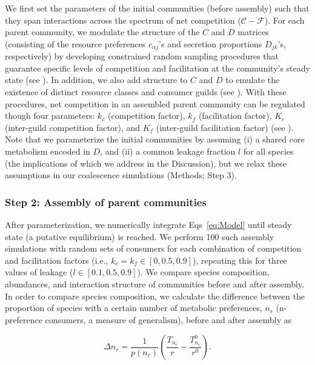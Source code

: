 \documentclass[10pt,letterpaper]{article}
\begin{document}
We first set the parameters of the initial communities (before assembly) such that they span interactions across the spectrum of net competition ($\mathcal{C} - \mathcal{F}$). For each parent community, we modulate the structure of the $C$ and $D$ matrices (consisting of the resource preferences $ c_{\alpha j} $'s and secretion proportions $ D_{jk} $'s, respectively) by developing constrained random sampling procedures that guarantee specific levels of competition and facilitation at the community's steady state (see ). In addition, we also add structure to $C$ and $D$ to emulate the existence of distinct resource classes and consumer guilds (see ). With these procedures, net competition in an assembled parent community can be regulated though four parameters: $k_c$ (competition factor), $k_f$ (facilitation factor), $K_c$ (inter-guild competition factor), and $K_f$ (inter-guild facilitation factor) (see   ). Note that we parameterize the initial communities by assuming (i) a shared core metabolism encoded in $D$, and (ii) a common leakage fraction $l$ for all species (the implications of which we address in the Discussion), but we relax these assumptions in our coalescence simulations (Methods; Step 3).

\subsubsection*{Step 2: Assembly of parent communities}\vspace{-5pt}

After parameterization, we numerically integrate Eqs~\ref{eq:Model} until steady state (a putative equilibrium) is reached. We perform 100 such assembly simulations with random sets of consumers for each combination of competition and facilitation factors (i.e., $k_c = k_f \in [0, 0.5, 0.9]$), repeating this for three values of leakage ($l \in [0.1, 0.5, 0.9]$). We compare species composition, abundances, and interaction structure of communities before and after assembly. In order to compare species composition, we calculate the difference between the proportion of species with a certain number of metabolic preferences, $n_r$ (n-preference consumers, a measure of generalism), before and after assembly as 

\begin{equation*}
    \Delta{n_r} = \frac{1}{p(n_r)}\left(\frac{T_{n_r}}{r} - \frac{T_{n_r}^0}{r^0}\right).
\end{equation*}
\end{document}
